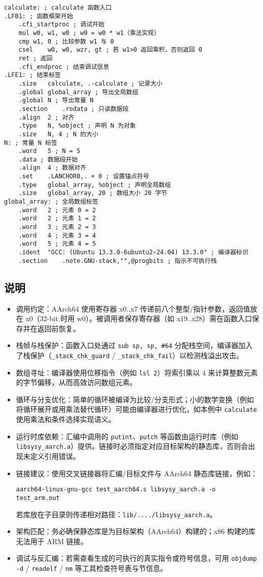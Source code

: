 \documentclass[UTF8,a4paper,10pt]{ctexart}
\begin{document}
\begin{lstlisting}[title=逐列访问平凡算法,frame=trbl]
calculate: ; calculate 函数入口
.LFB1: ; 函数框架开始
	.cfi_startproc ; 调试开始
	mul	w0, w1, w0 ; w0 = w0 * w1（乘法实现）
	cmp	w1, 0 ; 比较参数 w1 与 0
	csel	w0, w0, wzr, gt ; 若 w1>0 返回乘积，否则返回 0
	ret ; 返回
	.cfi_endproc ; 结束调试信息
.LFE1: ; 结束标签
	.size	calculate, .-calculate ; 记录大小
	.global	global_array ; 导出全局数组
	.global	N ; 导出常量 N
	.section	.rodata ; 只读数据段
	.align	2 ; 对齐
	.type	N, %object ; 声明 N 为对象
	.size	N, 4 ; N 的大小
N: ; 常量 N 标签
	.word	5 ; N = 5
	.data ; 数据段开始
	.align	4 ; 数据对齐
	.set	.LANCHOR0,. + 0 ; 设置锚点符号
	.type	global_array, %object ; 声明全局数组
	.size	global_array, 20 ; 数组大小 20 字节
global_array: ; 全局数组标签
	.word	2 ; 元素 0 = 2
	.word	2 ; 元素 1 = 2
	.word	3 ; 元素 2 = 3
	.word	4 ; 元素 3 = 4
	.word	5 ; 元素 4 = 5
	.ident	"GCC: (Ubuntu 13.3.0-6ubuntu2~24.04) 13.3.0" ; 编译器标识
	.section	.note.GNU-stack,"",@progbits ; 指示不可执行栈

\end{lstlisting}
\subsection{说明}
\begin{itemize}
	\item 调用约定：AArch64 使用寄存器 x0..x7 传递前八个整型/指针参数，返回值放在 x0（32-bit 时用 w0）。被调用者保存寄存器（如 x19..x28）需在函数入口保存并在返回前恢复。
	\item 栈帧与栈保护：函数入口处通过 \texttt{sub sp, sp, \#64} 分配栈空间，编译器加入了栈保护（\texttt{\_stack\_chk\_guard} / \texttt{\_stack\_chk\_fail}）以检测栈溢出攻击。
	\item 数组寻址：编译器使用位移指令（例如 \texttt{lsl 2}）将索引乘以 4 来计算整数元素的字节偏移，从而高效访问数组元素。
	\item 循环与分支优化：简单的循环被编译为比较/分支形式；小的数学变换（例如将循环展开或用乘法替代循环）可能由编译器进行优化，如本例中 \texttt{calculate} 使用乘法和条件选择实现语义。
	\item 运行时库依赖：汇编中调用的 \texttt{putint}、\texttt{putch} 等函数由运行时库（例如 \texttt{libsysy\_aarch.a}）提供。链接时必须指定对应目标架构的静态库，否则会出现未定义引用错误。
	\item 链接建议：使用交叉链接器将汇编/目标文件与 AArch64 静态库链接，例如：
	\begin{verbatim}
aarch64-linux-gnu-gcc test_aarch64.s libsysy_aarch.a -o test_arm.out
	\end{verbatim}
	若库放在子目录则传递相对路径：\texttt{lib/..../libsysy\_aarch.a}。
	\item 架构匹配：务必确保静态库是为目标架构（AArch64）构建的；x86 构建的库无法用于 ARM 链接。
	\item 调试与反汇编：若需查看生成的可执行的真实指令或符号信息，可用 \texttt{objdump -d} / \texttt{readelf} / \texttt{nm} 等工具检查符号表与节信息。
\end{itemize}
\end{document}
